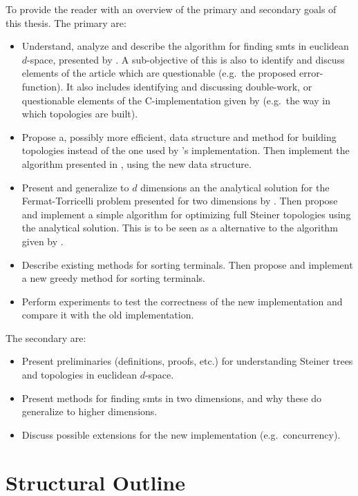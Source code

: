 To provide the reader with an overview of the primary and secondary goals of
this thesis. The primary are:
%
\begin{itemize}
\item Understand, analyze and describe the algorithm for finding \aclp{smt} in
  euclidean $d$-space, presented by \textcite{smith1992}. A sub-objective of
  this is also to identify and discuss elements of the article which are
  questionable (e.g.\ the proposed error-function). It also includes identifying
  and discussing double-work, or questionable elements of the C-implementation
  given by \textcite{smith1992} (e.g.\ the way in which topologies are built).
\item Propose a, possibly more efficient, data structure and method for building
  topologies instead of the one used by \citeauthor{smith1992}'s implementation.
  Then implement the algorithm presented in \textcite{smith1992}, using the new
  data structure.
\item Present and generalize to $d$ dimensions an the analytical solution for
  the Fermat-Torricelli problem presented for two dimensions by
  \textcite{uteshev2014}. Then propose and implement a simple algorithm for
  optimizing full Steiner topologies using the analytical solution. This is to
  be seen as a alternative to the algorithm given by \textcite{smith1992}.
\item Describe existing methods for sorting terminals. Then propose and
  implement a new greedy method for sorting terminals.
\item Perform experiments to test the correctness of the new implementation and
  compare it with the old implementation.
\end{itemize}

The secondary are:
%
\begin{itemize}
\item Present preliminaries (definitions, proofs, etc.) for understanding
  Steiner trees and topologies in euclidean $d$-space.
\item Present methods for finding \aclp{smt} in two dimensions, and why
  these do generalize to higher dimensions.
\item Discuss possible extensions for the new implementation (e.g.\
  concurrency).
\end{itemize}

\section{Structural Outline}
\label{sec:structural-outline}

